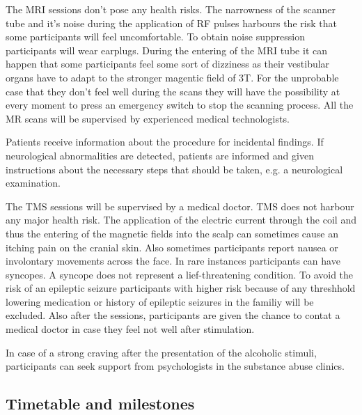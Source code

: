 \documentclass[12pt]{article}
\begin{document}
The MRI sessions don't pose any health risks. The narrowness of the scanner tube and it's noise during the application of RF pulses harbours the risk that some participants will feel uncomfortable. To obtain noise suppression participants will wear earplugs. During the entering of the MRI tube it can happen that some participants feel some sort of dizziness as their vestibular organs have to adapt to the stronger magentic field of 3T. For the unprobable case that they don't feel well during the scans they will have the possibility at every moment to press an emergency switch to stop the scanning process. All the MR scans will be supervised by experienced medical technologists. 

Patients receive information about the procedure for incidental findings. If neurological abnormalities are detected, patients are informed and given instructions about the necessary steps that should be taken, e.g. a neurological examination.

The TMS sessions will be supervised by a medical doctor. TMS does not harbour any major health risk. The application of the electric current through the coil and thus the entering of the magnetic fields into the scalp can sometimes cause an itching pain on the cranial skin. Also sometimes participants report nausea or involontary movements across the face. In rare instances participants can have syncopes. A syncope does not represent a lief-threatening condition. To avoid the risk of an epileptic seizure participants with higher risk because of any threshhold lowering medication or history of epileptic seizures in the familiy will be excluded. Also after the sessions, participants are given the chance to contat a medical doctor in case they feel not well after stimulation. 

In case of a strong craving after the presentation of the alcoholic stimuli, participants can seek support from psychologists in the substance abuse clinics.
 

\subsection{Timetable and milestones}
\end{document}
